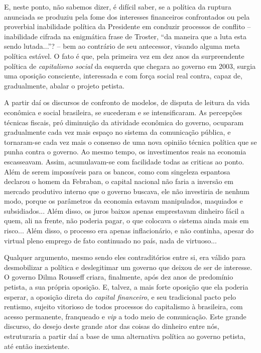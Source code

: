 E, neste ponto, não sabemos dizer, é difícil saber, se a política da
ruptura anunciada se produziu pela fome dos interesses financeiros
confrontados ou pela proverbial inabilidade política da Presidente em
conduzir processos de conflito -- inabilidade cifrada na enigmática
frase de Troster, ``da maneira que a luta esta sendo lutada...''? -- bem
ao contrário de seu antecessor, visando alguma meta política estável. O
fato é que, pela primeira vez em dez anos da surpreendente política de
\emph{capitalismo social} da esquerda que chegara ao governo em 2003,
surgia uma oposição consciente, interessada e com força social real
contra, capaz de, gradualmente, abalar o projeto petista.

A partir daí os discursos de confronto de modelos, de disputa de leitura
da vida econômica e social brasileira, se sucederam e se intensificaram.
As percepções técnicas fiscais, pró diminuição da atividade econômica do
governo, ocuparam gradualmente cada vez mais espaço no sistema da
comunicação pública, e tornaram-se cada vez mais o consenso de uma nova
opinião técnica política que se punha contra o governo. Ao mesmo tempo,
os investimentos reais na economia escasseavam. Assim, acumulavam-se com
facilidade todas as criticas ao ponto. Além de serem impossíveis para os
bancos, como com singeleza espantosa declarou o homem da Febraban, o
capital nacional não faria a inversão em mercado produtivo interno que o
governo buscava, ele não investiria de nenhum modo, porque os parâmetros
da economia estavam manipulados, maquiados e subsidiados... Além disso,
os juros baixos apenas emprestavam dinheiro fácil a quem, ali na frente,
não poderia pagar, o que colocava o sistema ainda mais em risco... Além
disso, o processo era apenas inflacionário, e não continha, apesar do
virtual pleno emprego de fato continuado no país, nada de virtuoso...

Qualquer argumento, mesmo sendo eles contraditórios entre si, era válido
para desmobilizar a política e deslegitimar um governo que deixou de ser
de interesse. O governo Dilma Rousseff criara, finalmente, após dez anos
de predomínio petista, a sua própria oposição. E, talvez, a mais forte
oposição que ela poderia esperar, a oposição direta do \emph{capital
financeiro}, e seu tradicional pacto pelo rentismo, sujeito vitorioso de
todos processos do capitalismo à brasileira, com acesso permanente,
franqueado e \emph{vip} a todo meio de comunicação. Este grande
discurso, do desejo deste grande ator das coisas do dinheiro entre nós,
estruturaria a partir daí a base de uma alternativa política ao governo
petista, até então inexistente.

